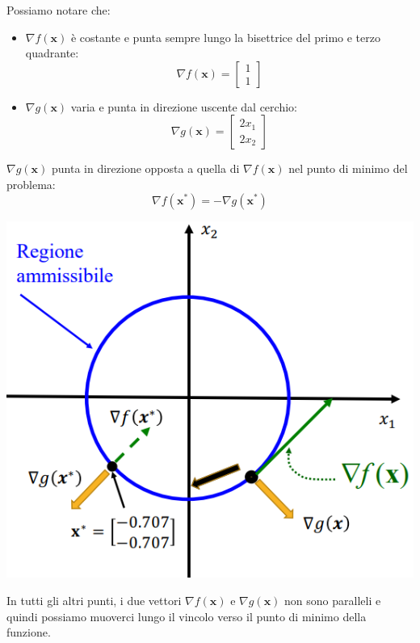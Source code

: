 \documentclass[12pt]{article}
\begin{document}
Possiamo notare che:
\begin{itemize}
    \item $\nabla f(\boldsymbol{x})$ è costante e punta sempre lungo la bisettrice del primo e terzo quadrante: $$\nabla f(\boldsymbol{x}) = \begin{bmatrix}
        1 \\
        1
    \end{bmatrix}$$
    \item $\nabla g(\boldsymbol{x})$ varia e punta in direzione uscente dal cerchio: $$\nabla g(\boldsymbol{x}) = \begin{bmatrix}
        2x_1 \\
        2x_2
    \end{bmatrix}$$
\end{itemize}
$\nabla g(\boldsymbol{x})$ punta in direzione opposta a quella di $\nabla f(\boldsymbol{x})$ nel punto di minimo del problema:
$$\nabla f(\boldsymbol{x^*}) = -\nabla g(\boldsymbol{x^*})$$
\begin{center}
    \includegraphics[width = 0.50\linewidth]{Images/106.PNG}
\end{center}
In tutti gli altri punti, i due vettori $\nabla f(\boldsymbol{x})$ e $\nabla g(\boldsymbol{x})$ non sono paralleli e quindi possiamo muoverci lungo il vincolo
verso il punto di minimo della funzione.
\end{document}
